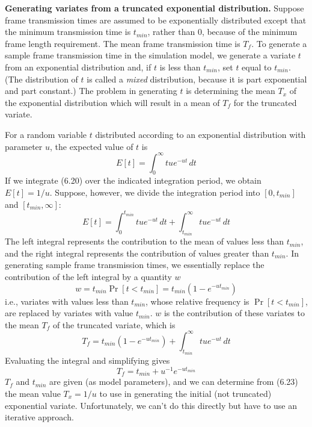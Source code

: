 \noindent\textbf{Generating variates from a truncated exponential distribution.} Suppose frame transmission times are assumed to be exponentially distributed except that the minimum transmission time is $t_{min}$, rather than 0, because of the minimum frame length requirement. The mean frame transmission time is $T_f$. To generate a sample frame transmission time in the simulation model, we generate a variate $t$ from an exponential distribution and, if $t$ is less than $t_{min}$, set $t$ equal to $t_{min}$. (The distribution of $t$ is called a \emph{mixed} distribution, because it is part exponential and part constant.) The problem in generating $t$ is determining the mean $T_x$ of the exponential distribution which will result in a mean of $T_f$ for the truncated variate.



For a random variable $t$ distributed according to an exponential distribution with parameter $u$, the expected value of $t$ is
\begin{equation} E[t]=\int_0^\infty tu e^{-ut}\,dt \end{equation}
If we integrate (6.20) over the indicated integration period, we obtain $E[t]=1/u$. Suppose, however, we divide the integration period into $[0,t_{min}]$ and $[t_{min},\infty]$:
\begin{equation} E[t]=\int_0^{t_{min}}tu e^{-ut}\,dt+\int_{t_{min}}^\infty tu e^{-ut}\,dt \end{equation}
The left integral represents the contribution to the mean of values less than $t_{min}$, and the right integral represents the contribution of values greater than $t_{min}$. In generating sample frame transmission times, we essentially replace the contribution of the left integral by a quantity $w$
\begin{equation} w=t_{min}\Pr[t<t_{min}]=t_{min}(1-e^{-ut_{min}}) \end{equation}
i.e., variates with values less than $t_{min}$, whose relative frequency is $\Pr[t<t_{min}]$, are replaced by variates with value $t_{min}$. $w$ is the contribution of these variates to the mean $T_f$ of the truncated variate, which is
\begin{equation} T_f=t_{min}(1-e^{-ut_{min}})+\int_{t_{min}}^\infty tu e^{-ut}\,dt \end{equation}
Evaluating the integral and simplifying gives
\begin{equation} T_f=t_{min}+u^{-1}e^{-ut_{min}} \end{equation}
$T_f$ and $t_{min}$ are given (as model parameters), and we can determine from (6.23) the mean value $T_x=1/u$ to use in generating the initial (not truncated) exponential variate. Unfortunately, we can't do this directly but have to use an iterative approach.

